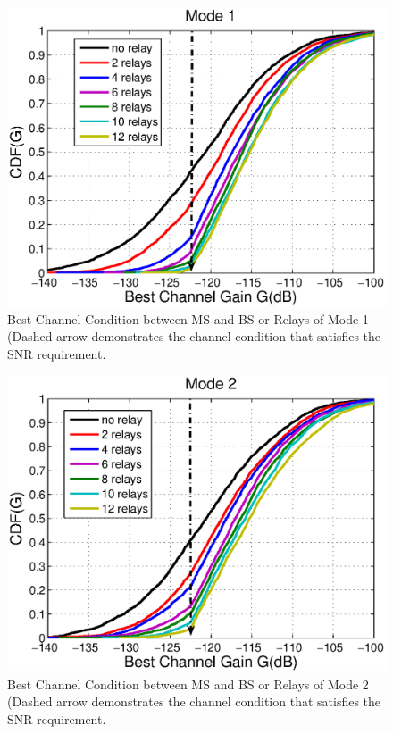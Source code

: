 \begin{figure}
\centering
\includegraphics[width=12cm]{Mode1_bestchannelgain_V2.eps}
\caption{Best Channel Condition between MS and BS or Relays of Mode 1 (Dashed arrow demonstrates the channel condition that satisfies the SNR requirement.}
\label{Mode1}
\end{figure}
\begin{figure}
\centering
\includegraphics[width=12cm]{Mode2_bestchannelgain_V2.eps}
\caption{Best Channel Condition between MS and BS or Relays of Mode 2 (Dashed arrow demonstrates the channel condition that satisfies the SNR requirement.}
\label{Mode2}
\end{figure}
